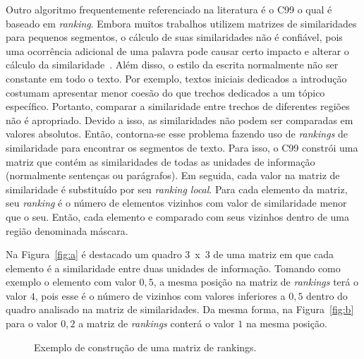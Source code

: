 
Outro algoritmo frequentemente referenciado na literatura é o C99 o qual é baseado em \textit{ranking}. Embora muitos trabalhos utilizem matrizes de similaridades para pequenos segmentos, o cálculo de suas similaridades não é confiável, pois uma ocorrência adicional de uma palavra pode causar certo impacto e alterar o cálculo da similaridade~\cite{Choi2000}. Além disso, o estilo da escrita normalmente não ser constante em todo o texto. Por exemplo, textos iniciais dedicados a introdução costumam apresentar menor coesão do que trechos dedicados a um tópico específico. Portanto, comparar a similaridade entre trechos de diferentes regiões não é apropriado. Devido a isso, as similaridades não podem ser comparadas em valores absolutos. Então, contorna-se esse problema fazendo uso de \textit{rankings} de similaridade para encontrar os segmentos de texto. Para isso, o C99 constrói uma matriz que contém as similaridades de todas as unidades de informação (normalmente sentenças ou parágrafos). Em seguida, cada valor na matriz de similaridade é substituído por seu \textit{ranking local}. Para cada elemento da matriz, seu \textit{ranking} é o número de elementos vizinhos com valor de similaridade menor que o seu. Então, cada elemento e comparado com seus vizinhos dentro de uma região denominada máscara.

Na Figura~\ref{fig:a} é destacado um quadro 3~x~3 de uma matriz em que cada elemento é a similaridade entre duas unidades de informação. Tomando como exemplo o elemento com valor $0,5$, a mesma posição na matriz de \textit{rankings} terá o valor $4$, pois esse é o número de vizinhos com valores inferiores a $0,5$ dentro do quadro analisado na matriz de similaridades. Da mesma forma, na Figura~\ref{fig:b} para o valor $0,2$ a matriz de \textit{rankings} conterá o valor $1$ na mesma posição.

\begin{figure}[!h]
	\centering     %

	
	\caption{Exemplo de construção de uma matriz de rankings.%
	}
	\label{fig:exemplomatrixrank}
\end{figure}



